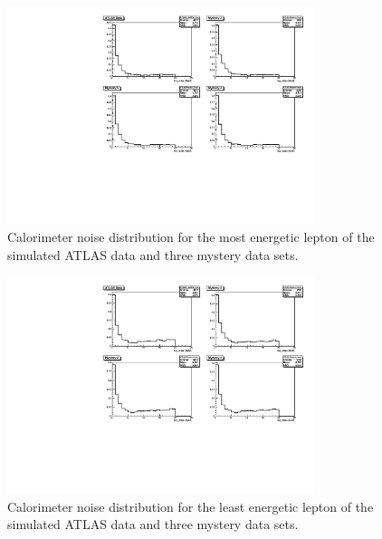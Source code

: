 \documentclass[twoside,        %
               BCOR12mm,       %
               ngerman,english, %
               fleqn,headsepline=false,footsepline=false
              ]{Vorlage/MFPREPORT}
\begin{document}
\begin{figure}[]
    \begin{center}
        \includegraphics[width=0.8\textwidth]{ZZ/mystery_et_iso_1_uncut.pdf}
    \end{center}
    \caption{Calorimeter noise distribution for the most energetic lepton of the simulated ATLAS data and three mystery data sets.}
    \label{fig:myst2}
\end{figure}


\begin{figure}[]
    \begin{center}
        \includegraphics[width=0.8\textwidth]{ZZ/mystery_et_iso_4_uncut.pdf}
    \end{center}
    \caption{Calorimeter noise distribution for the least energetic lepton of the simulated ATLAS data and three mystery data sets.}
    \label{fig:myst3}
\end{figure}
\end{document}
